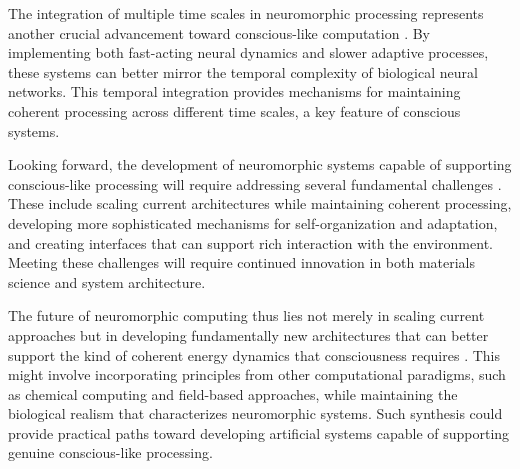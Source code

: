 The integration of multiple time scales in neuromorphic processing represents another crucial advancement toward conscious-like computation \cite{Yang2019}. By implementing both fast-acting neural dynamics and slower adaptive processes, these systems can better mirror the temporal complexity of biological neural networks. This temporal integration provides mechanisms for maintaining coherent processing across different time scales, a key feature of conscious systems.

Looking forward, the development of neuromorphic systems capable of supporting conscious-like processing will require addressing several fundamental challenges \cite{Indiveri2020}. These include scaling current architectures while maintaining coherent processing, developing more sophisticated mechanisms for self-organization and adaptation, and creating interfaces that can support rich interaction with the environment. Meeting these challenges will require continued innovation in both materials science and system architecture.

The future of neuromorphic computing thus lies not merely in scaling current approaches but in developing fundamentally new architectures that can better support the kind of coherent energy dynamics that consciousness requires \cite{Markovic2020}. This might involve incorporating principles from other computational paradigms, such as chemical computing and field-based approaches, while maintaining the biological realism that characterizes neuromorphic systems. Such synthesis could provide practical paths toward developing artificial systems capable of supporting genuine conscious-like processing.